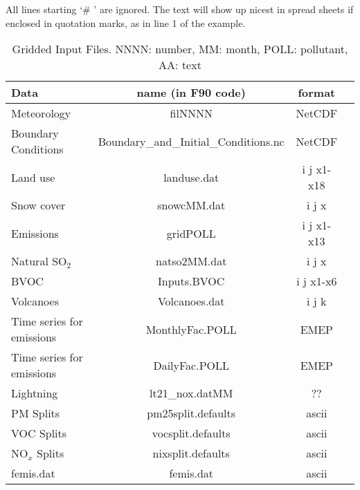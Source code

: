  All lines starting `\# ' are ignored. The text will show up nicest in
 spread sheets if enclosed in quotation marks, as in line 1 of the example.

\begin{table}[h]
\caption{Gridded Input Files. NNNN: number, MM: month, POLL: pollutant, AA: text}
\label{Tab:Inputs}
\begin{tabular}{lccc}\hline
Data & name (in F90 code) & format\\ \hline
Meteorology&filNNNN&NetCDF\\
Boundary Conditions&Boundary\_and\_Initial\_Conditions.nc&NetCDF\\
Land use&landuse.dat&i j x1-x18 \\ %
Snow cover&snowcMM.dat&i j x\\
Emissions&gridPOLL&i j x1-x13\\
Natural SO$_{2}$&natso2MM.dat&i j x\\
BVOC&Inputs.BVOC&i j x1-x6 \\ %
Volcanoes&Volcanoes.dat&i j k   \\ %
Time series for emissions&MonthlyFac.POLL&EMEP\\
Time series for emissions&DailyFac.POLL&EMEP\\
Lightning&lt21\_nox.datMM&??& \\
PM Splits  &pm25split.defaults&ascii \\
VOC Splits&vocsplit.defaults&ascii \\
NO$_{x}$ Splits& nixsplit.defaults&ascii\\
femis.dat & femis.dat    & ascii  \\
\hline
\end{tabular}
\end{table}

